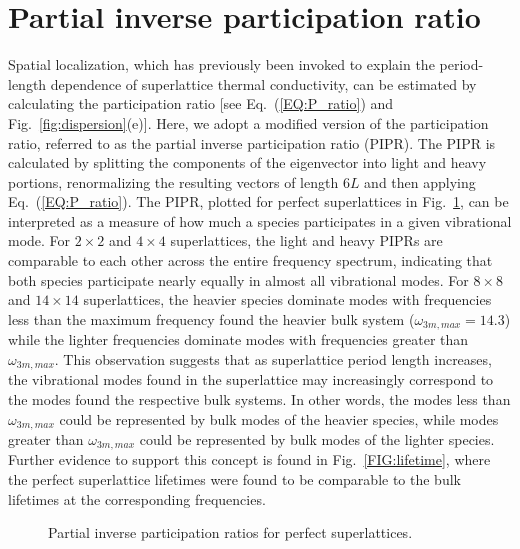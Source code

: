 \documentclass[aps,prb,preprint,preprintnumbers,amsmath,amssymb,floatfix,superscriptaddress]{revtex4}
\begin{document}
\section{Partial inverse participation ratio}\label{app:partialpnum}
Spatial localization, which has previously been invoked to explain the period-length dependence of superlattice thermal conductivity, \cite{PhysRevB.61.3091} can be estimated by calculating the participation ratio [see Eq.~(\ref{EQ:P_ratio}) and Fig.~\ref{fig:dispersion}(e)]. Here, we adopt a modified version of the participation ratio, referred to as the partial inverse participation ratio (PIPR). The PIPR is calculated by splitting the components of the eigenvector into light and heavy portions, renormalizing the resulting vectors of length $6L$ and then applying Eq.~(\ref{EQ:P_ratio}). The PIPR, plotted for perfect superlattices in Fig.~\ref{FIG:ipnum}, can be interpreted as a measure of how much a species participates in a given vibrational mode. For $2 \times 2$ and $4 \times 4$ superlattices, the light and heavy PIPRs are comparable to each other across the entire frequency spectrum, indicating that both species participate nearly equally in almost all vibrational modes. For $8 \times 8$ and $14 \times 14$ superlattices, the heavier species dominate modes with frequencies less than the maximum frequency found the heavier bulk system ($\omega_{3m,max}=14.3$) while the lighter frequencies dominate modes with frequencies greater than $\omega_{3m,max}$. This observation suggests that as superlattice period length increases, the vibrational modes found in the superlattice may increasingly correspond to the modes found the respective bulk systems. In other words, the modes less than $\omega_{3m,max}$ could be represented by bulk modes of the heavier species, while modes greater than $\omega_{3m,max}$ could be represented by bulk modes of the lighter species. Further evidence to support this concept is found in Fig.~\ref{FIG:lifetime}, where the perfect superlattice lifetimes were found to be comparable to the bulk lifetimes at the corresponding frequencies.
\begin{figure}[h!]
\begin{center}
\renewcommand{\figure}{Fig.}
\caption{Partial inverse participation ratios for perfect superlattices.}
\label{FIG:ipnum}
\end{center}
\end{figure}
\end{document}
